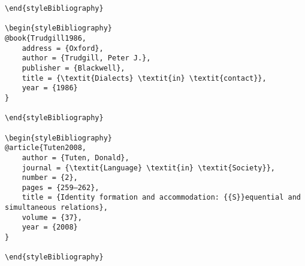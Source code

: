 \documentclass[output=paper]{langsci/langscibook}
\begin{document}
\begin{verbatim}
\end{styleBibliography}

\begin{styleBibliography}
@book{Trudgill1986,
	address = {Oxford},
	author = {Trudgill, Peter J.},
	publisher = {Blackwell},
	title = {\textit{Dialects} \textit{in} \textit{contact}},
	year = {1986}
}

\end{styleBibliography}

\begin{styleBibliography}
@article{Tuten2008,
	author = {Tuten, Donald},
	journal = {\textit{Language} \textit{in} \textit{Society}},
	number = {2},
	pages = {259–262},
	title = {Identity formation and accommodation: {{S}}equential and simultaneous relations},
	volume = {37},
	year = {2008}
}

\end{styleBibliography}

\end{verbatim} 
{\sloppy\printbibliography[heading=subbibliography,notkeyword=this]}
\end{document}
